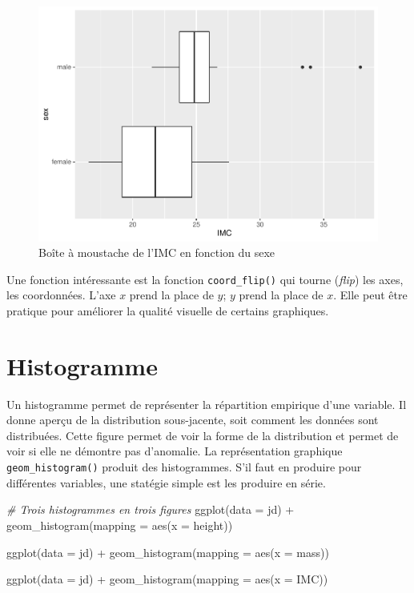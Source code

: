 \documentclass[
]{book}
\newenvironment{Shaded}{}{}
\newcommand{\AttributeTok}[1]{#1}
\newcommand{\CommentTok}[1]{\textit{#1}}
\newcommand{\FunctionTok}[1]{#1}
\newcommand{\NormalTok}[1]{#1}
\newcommand{\SpecialCharTok}[1]{#1}
\begin{document}
\begin{figure}

{\centering \includegraphics[width=0.75\linewidth,height=0.75\textheight]{07-Visualiser_files/figure-latex/boxplot1-1} 

}

\caption{Boîte à moustache de l'IMC en fonction du sexe}\label{fig:boxplot1}
\end{figure}

Une fonction intéressante est la fonction \texttt{coord\_flip()} qui tourne (\emph{flip}) les axes, les coordonnées. L'axe \(x\) prend la place de \(y\); \(y\) prend la place de \(x\). Elle peut être pratique pour améliorer la qualité visuelle de certains graphiques.

\hypertarget{histogramme}{%
\section{Histogramme}\label{histogramme}}

Un histogramme permet de représenter la répartition empirique d'une variable. Il donne aperçu de la distribution sous-jacente, soit comment les données sont distribuées. Cette figure permet de voir la forme de la distribution et permet de voir si elle ne démontre pas d'anomalie. La représentation graphique \texttt{geom\_histogram()} produit des histogrammes. S'il faut en produire pour différentes variables, une statégie simple est les produire en série.

\begin{Shaded}
\begin{Highlighting}[]
\CommentTok{\# Trois histogrammes en trois figures}
\FunctionTok{ggplot}\NormalTok{(}\AttributeTok{data =}\NormalTok{ jd) }\SpecialCharTok{+} 
  \FunctionTok{geom\_histogram}\NormalTok{(}\AttributeTok{mapping =} \FunctionTok{aes}\NormalTok{(}\AttributeTok{x =}\NormalTok{ height))}

\FunctionTok{ggplot}\NormalTok{(}\AttributeTok{data =}\NormalTok{ jd) }\SpecialCharTok{+} 
  \FunctionTok{geom\_histogram}\NormalTok{(}\AttributeTok{mapping =} \FunctionTok{aes}\NormalTok{(}\AttributeTok{x =}\NormalTok{ mass))}

\FunctionTok{ggplot}\NormalTok{(}\AttributeTok{data =}\NormalTok{ jd) }\SpecialCharTok{+} 
  \FunctionTok{geom\_histogram}\NormalTok{(}\AttributeTok{mapping =} \FunctionTok{aes}\NormalTok{(}\AttributeTok{x =}\NormalTok{ IMC))}
\end{Highlighting}
\end{Shaded}
\end{document}
